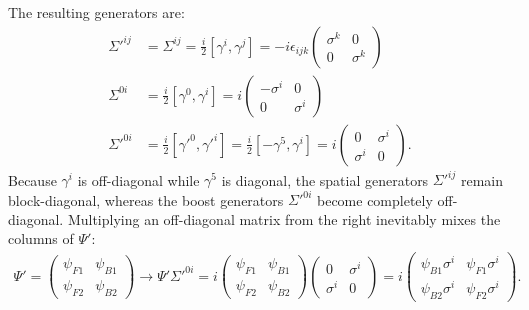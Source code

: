 The resulting generators are:
\begin{equation}
\begin{aligned}
    \Sigma'^{ij}&=\Sigma^{ij}=\frac{i}{2}[\gamma^i,\gamma^j]=-i\epsilon_{ijk}\begin{pmatrix}\sigma^k&0\\ 0&\sigma^k\end{pmatrix}\\
    \Sigma^{0i}&=\frac{i}{2}[\gamma^0,\gamma^i]=i\begin{pmatrix}-\sigma^i&0\\ 0&\sigma^i\end{pmatrix}\\
    \Sigma'^{0i}&=\frac{i}{2}[\gamma'^0,\gamma'^i]=\frac{i}{2}[-\gamma^5,\gamma^i]=i\begin{pmatrix}0&\sigma^i\\ \sigma^i&0\end{pmatrix}.
\end{aligned}
\end{equation}
Because $\gamma^i$ is off-diagonal while $\gamma^5$ is diagonal, the spatial generators $\Sigma'^{ij}$ remain block-diagonal, whereas the boost generators $\Sigma'^{0i}$ become completely off-diagonal. Multiplying an off-diagonal matrix from the right inevitably mixes the columns of $\Psi'$:
\begin{equation}
\begin{aligned}
    \Psi'=\begin{pmatrix}\psi_{F1}&\psi_{B1}\\ \psi_{F2}&\psi_{B2}\end{pmatrix}\to \Psi'\Sigma'^{0i}=i\begin{pmatrix}\psi_{F1}&\psi_{B1}\\ \psi_{F2}&\psi_{B2}\end{pmatrix}\begin{pmatrix}0&\sigma^i\\ \sigma^i&0\end{pmatrix}=i\begin{pmatrix}\psi_{B1}\sigma^i&\psi_{F1}\sigma^i\\ \psi_{B2}\sigma^i&\psi_{F2}\sigma^i\end{pmatrix}.
\end{aligned}
\end{equation}

